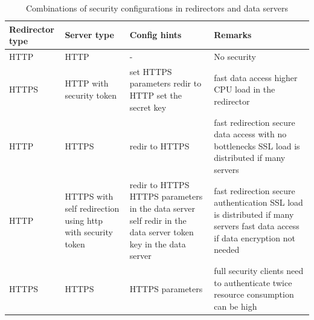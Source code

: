 \documentclass[12pt]{article} %
\begin{document}
\begin{table}

\centering %
\begin{center}


\tiny

\begin{tabulary}{\textwidth}{ L|L|L|L }

\hline \hline
\textbf{Redirector \linebreak type} & \textbf{Server \linebreak type} & \textbf{Config hints} & \textbf{Remarks} \\
\hline

HTTP & HTTP & - & No security \\
\hline
HTTPS & HTTP with \linebreak security token & set HTTPS parameters \linebreak redir to HTTP \linebreak set the secret key & fast data access \linebreak higher CPU load in the redirector \\
\hline
HTTP & HTTPS & redir to HTTPS & fast redirection \linebreak secure data access with no bottlenecks \linebreak SSL load is distributed if many servers\\
\hline
HTTP & HTTPS with \linebreak self redirection using \linebreak http with security token & redir to HTTPS \linebreak HTTPS parameters in the data server \linebreak self redir in the data server \linebreak token key in the data server & fast redirection \linebreak secure authentication \linebreak SSL load is distributed if many servers \linebreak fast data access if data encryption not needed \\
\hline
HTTPS & HTTPS & HTTPS parameters & full security \linebreak clients need to authenticate twice \linebreak resource consumption can be high \\
\hline

\end{tabulary} 

\normalsize
\caption{\label{table_combinations}Combinations of security configurations in redirectors and data servers} %

\end{center}

\end{table}
\end{document}
